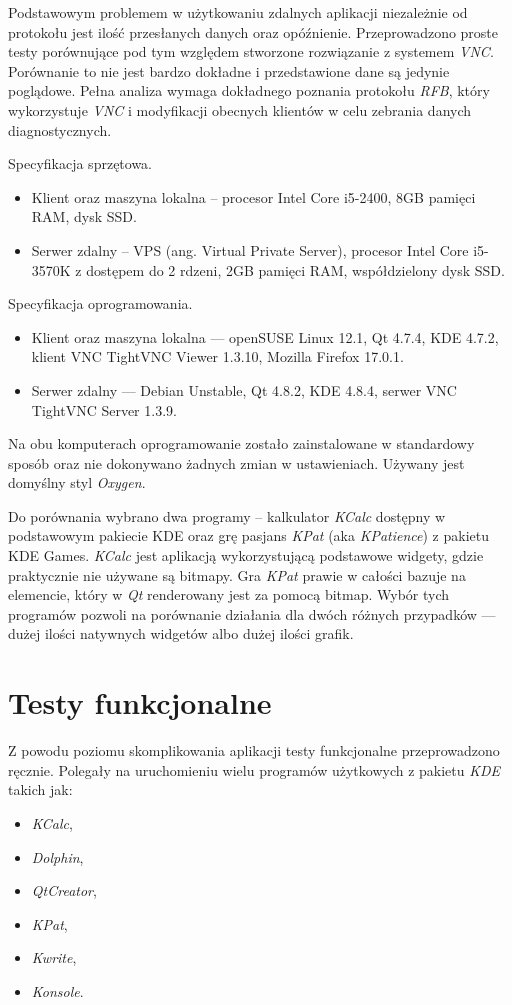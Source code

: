 Podstawowym problemem w użytkowaniu zdalnych aplikacji niezależnie od protokołu jest ilość przesłanych danych oraz opóźnienie. Przeprowadzono proste testy porównujące pod tym względem stworzone rozwiązanie z systemem \emph{VNC}. Porównanie to nie jest bardzo dokładne i przedstawione dane są jedynie poglądowe. Pełna analiza wymaga dokładnego poznania protokołu \emph{RFB}, który wykorzystuje \emph{VNC} i modyfikacji obecnych klientów w celu zebrania danych diagnostycznych.

Specyfikacja sprzętowa.
\begin{itemize}
\item Klient oraz maszyna lokalna -- procesor Intel Core i5-2400, 8GB pamięci RAM, dysk SSD.
\item Serwer zdalny -- VPS (ang. Virtual Private Server), procesor Intel Core i5-3570K z dostępem do 2 rdzeni, 2GB pamięci RAM, współdzielony dysk SSD.
\end{itemize}

Specyfikacja oprogramowania.
\begin{itemize}
\item Klient oraz maszyna lokalna --- openSUSE Linux 12.1, Qt 4.7.4, KDE 4.7.2, klient VNC TightVNC Viewer 1.3.10, Mozilla Firefox 17.0.1.
\item Serwer zdalny --- Debian Unstable, Qt 4.8.2, KDE 4.8.4, serwer VNC TightVNC Server 1.3.9.
\end{itemize}

Na obu komputerach oprogramowanie zostało zainstalowane w standardowy sposób oraz nie dokonywano żadnych zmian w ustawieniach. Używany jest domyślny styl \emph{Oxygen}.

Do porównania wybrano dwa programy -- kalkulator \emph{KCalc} dostępny w podstawowym pakiecie KDE oraz grę pasjans \emph{KPat} (aka \emph{KPatience}) z pakietu KDE Games. \emph{KCalc} jest aplikacją wykorzystującą podstawowe widgety, gdzie praktycznie nie używane są bitmapy. Gra \emph{KPat} prawie w całości bazuje na elemencie, który w \emph{Qt} renderowany jest za pomocą bitmap. Wybór tych programów pozwoli na porównanie działania dla dwóch różnych przypadków --- dużej ilości natywnych widgetów albo dużej ilości grafik.

\section {Testy funkcjonalne}
Z powodu poziomu skomplikowania aplikacji testy funkcjonalne przeprowadzono ręcznie. Polegały na uruchomieniu wielu programów użytkowych z pakietu \emph{KDE} takich jak:
\begin{itemize}
\item \emph{KCalc},
\item \emph{Dolphin},
\item \emph{QtCreator},
\item \emph{KPat},
\item \emph{Kwrite},
\item \emph{Konsole}.
\end{itemize}

